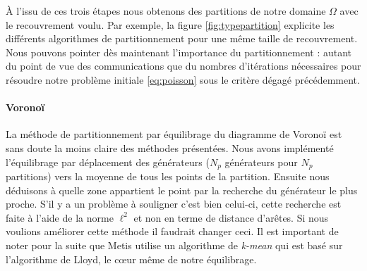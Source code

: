 \documentclass[a4paper,11pt]{article}
\begin{document}
À l'issu de ces trois étapes nous obtenons des partitions de notre domaine $\Omega$ avec le recouvrement voulu. Par exemple, la figure \ref{fig:typepartition} explicite les différents algorithmes de partitionnement pour une même taille de recouvrement. Nous pouvons pointer dès maintenant l'importance du partitionnement : autant du point de vue des communications que du nombres d'itérations nécessaires pour résoudre notre problème initiale \eqref{eq:poisson} sous le critère dégagé précédemment.\\
\paragraph{Voronoï} La méthode de partitionnement par équilibrage du diagramme de Voronoï est sans doute la moins claire des méthodes présentées. Nous avons implémenté l'équilibrage par déplacement des générateurs ($N_p$ générateurs pour $N_p$ partitions) vers la moyenne de tous les points de la partition. Ensuite nous déduisons à quelle zone appartient le point par la recherche du générateur le plus proche. S'il y a un problème à souligner c'est bien celui-ci, cette recherche est faite à l'aide de la norme $\ell^2$ et non en terme de distance d'arêtes. Si nous voulions améliorer cette méthode il faudrait changer ceci. Il est important de noter pour la suite que Metis utilise un algorithme de \textit{k-mean} qui est basé sur l'algorithme de Lloyd, le c\oe ur même de notre équilibrage.
\end{document}
